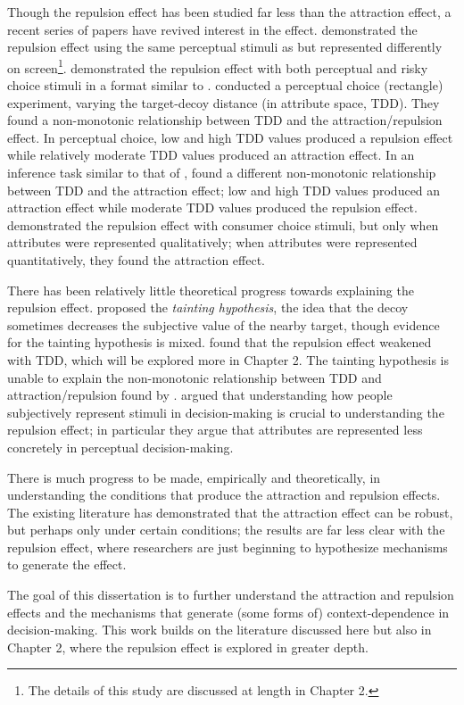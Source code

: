Though the repulsion effect has been studied far less than the attraction effect, a recent series of papers have revived interest in the effect. \textcite{spektorWhenGoodLooks2018b} demonstrated the repulsion effect using the same perceptual stimuli as \textcite{trueblood2013not} but represented differently on screen\footnote{The details of this study are discussed at length in Chapter 2.}. \textcite{spektorRepulsionEffectPreferential2022} demonstrated the repulsion effect with both perceptual and risky choice stimuli in a format similar to \textcite{spektorWhenGoodLooks2018b}. \textcite{liaoInfluenceDistanceDecoy2021} conducted a perceptual choice (rectangle) experiment, varying the target-decoy distance (in attribute space, TDD). They found a non-monotonic relationship between TDD and the attraction/repulsion effect. In perceptual choice, low and high TDD values produced a repulsion effect while relatively moderate TDD values produced an attraction effect. In an inference task similar to that of \textcite{truebloodMultialternativeContextEffects2012}, \textcite{liaoInfluenceDistanceDecoy2021} found a different non-monotonic relationship between TDD and the attraction effect; low and high TDD values produced an attraction effect while moderate TDD values produced the repulsion effect. \textcite{brendlPreferentialAttractionEffects2023} demonstrated the repulsion effect with consumer choice stimuli, but only when attributes were represented qualitatively; when attributes were represented quantitatively, they found the attraction effect.

There has been relatively little theoretical progress towards explaining the repulsion effect. \textcite{frederick2008attraction} proposed the \textit{tainting hypothesis}, the idea that the decoy sometimes decreases the subjective value of the nearby target, though evidence for the tainting hypothesis is mixed. \textcite{spektorWhenGoodLooks2018b} found that the repulsion effect weakened with TDD, which will be explored more in Chapter 2. The tainting hypothesis is unable to explain the non-monotonic relationship between TDD and attraction/repulsion found by \textcite{liaoInfluenceDistanceDecoy2021}. \textcite{spektorElusivenessContextEffects2021} argued that understanding how people subjectively represent stimuli in decision-making is crucial to understanding the repulsion effect; in particular they argue that attributes are represented less concretely in perceptual decision-making.

There is much progress to be made, empirically and theoretically, in understanding the conditions that produce the attraction and repulsion effects. The existing literature has demonstrated that the attraction effect can be robust, but perhaps only under certain conditions; the results are far less clear with the repulsion effect, where researchers are just beginning to hypothesize mechanisms to generate the effect. 

The goal of this dissertation is to further understand the attraction and repulsion effects and the mechanisms that generate (some forms of) context-dependence in decision-making. This work builds on the literature discussed here but also in Chapter 2, where the repulsion effect is explored in greater depth. 
 

